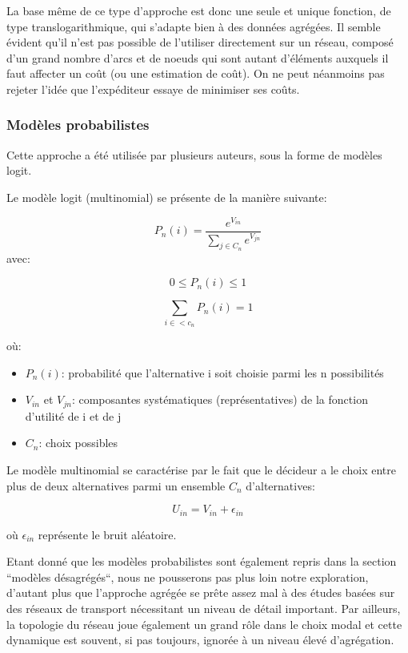 La base même de ce type d'approche est donc une seule et unique fonction, de
type translogarithmique, qui s'adapte bien à des données agrégées. Il semble
évident qu'il n'est pas possible de l'utiliser directement sur un réseau,
composé d'un grand nombre d'arcs et de noeuds qui sont autant d'éléments
auxquels il faut affecter un coût (ou une estimation de coût). On ne peut
néanmoins pas rejeter l'idée que l'expéditeur essaye de minimiser ses coûts.


\subsubsection{Mod\`eles probabilistes}

Cette approche a été utilisée par plusieurs auteurs, sous la forme
de modèles logit.

Le modèle logit (multinomial) se présente de la manière suivante:

$$P_n(i)=\frac{e^{V_{in}}}{\sum\limits_{j\in C_n}e^{V_{jn}}}$$
avec:

$$0 \leq P_n(i) \leq 1$$

$$\sum \limits_{i \in <c_n}P_n(i) = 1$$


où:

\begin{itemize}
\item $P_n(i)$: probabilité que l'alternative i soit choisie parmi les n
possibilités
\item $V_{in}$ et $V_{jn}$: composantes systématiques (représentatives)
de la fonction d'utilité de i et de j
\item $C_n$: choix possibles
\end{itemize}


Le modèle multinomial se caractérise par le fait que le décideur a
le choix entre plus de deux alternatives parmi un ensemble $C_n$
d'alternatives:

$$U_{in}=V_{in}+\epsilon _{in}$$

où $\epsilon _{in}$ représente le bruit aléatoire.


Etant donné que les modèles probabilistes sont également repris dans la section
``modèles désagrégés``, nous ne pousserons pas plus loin notre exploration,
d'au\-tant plus que l'approche agrégée se prête assez mal à des études basées
sur des réseaux de transport nécessitant un niveau de détail important. Par
ailleurs, la topologie du réseau joue également un grand rôle dans le choix
modal et cette dynamique est souvent, si pas toujours, ignorée à un niveau élevé
d'agrégation.


